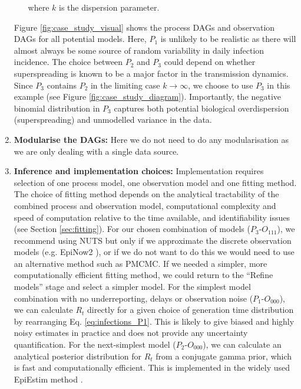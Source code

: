 \documentclass{article}
\begin{document}
\begin{enumerate}
\begin{itemize}
    where $k$ is the dispersion parameter. 
    \end{itemize} 
Figure \ref{fig:case_study_visual} shows the process DAGs and observation DAGs for all potential models. Here, $P_1$ is unlikely to be realistic as there will almost always be some source of random variability in daily infection incidence. The choice between $P_2$ and $P_3$ could depend on whether superspreading is known to be a major factor in the transmission dynamics. Since $P_3$ contains $P_2$ in the limiting case $k\to\infty$, we choose to use $P_3$ in this example (see Figure \ref{fig:case_study_diagram}).
Importantly, the negative binomial distribution in $P_3$ captures both potential biological overdispersion (superspreading) and unmodelled variance in the data. 


\item \textbf{Modularise the DAGs:} Here we do not need to do any modularisation as we are only dealing with a single data source.

\item \textbf{Inference and implementation choices:} Implementation requires selection of one process model, one observation model and one fitting method. The choice of fitting method depends on the analytical tractability of the combined process and observation model, computational complexity and speed of computation relative to the time available, and identifiability issues (see Section \ref{sec:fitting}). 
For our chosen combination of models ($P_3$-$O_{111}$), we recommend using NUTS but only if we approximate the discrete observation models (e.g. EpiNow2 \citep{abbott2020estimating}), or if we do not want to do this we would need to use an alternative method such as PMCMC. If we needed a simpler, more computationally efficient fitting method, we could return to the ``Refine models'' stage and select a simpler model. For the simplest model combination with no underreporting, delays or observation noise ($P_1$-$O_{000}$), we can calculate $R_t$ directly for a given choice of generation time distribution by rearranging Eq. \eqref{eq:infections_P1}. This is likely to give biased and highly noisy estimates in practice and does not provide any uncertainty quantification. For the next-simplest model ($P_2$-$O_{000}$), we can calculate an analytical posterior distribution for $R_t$  from a conjugate gamma prior, which is fast and computationally efficient. This is implemented in the widely used EpiEstim method \citep{cori2013new}. 


\end{enumerate}
\end{document}
